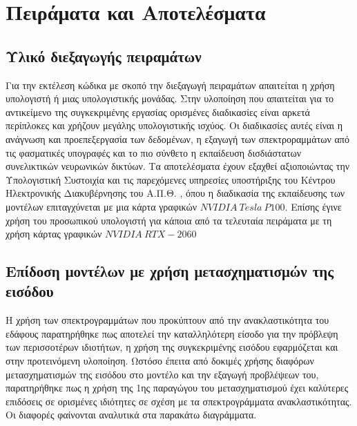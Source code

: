 \chapter{Πειράματα και Αποτελέσματα}
\label{ch:experiments_and_results}

\section{Υλικό διεξαγωγής πειραμάτων}
Για την εκτέλεση κώδικα με σκοπό την διεξαγωγή πειραμάτων απαιτείται η χρήση υπολογιστή ή μιας υπολογιστικής μονάδας. Στην υλοποίηση που απαιτείται για το αντικείμενο της συγκεκριμένης εργασίας ορισμένες διαδικασίες είναι αρκετά περίπλοκες και χρήζουν μεγάλης υπολογιστικής ισχύος. Οι διαδικασίες αυτές είναι η ανάγνωση και προεπεξεργασία των δεδομένων, η εξαγωγή των σπεκτροραμμάτων από τις φασματικές υπογραφές και το πιο σύνθετο η εκπαίδευση δισδιάστατων συνελικτικών νευρωνικών δικτύων.
Τα αποτελέσματα έχουν εξαχθεί αξιοποιώντας την Υπολογιστική Συστοιχία και τις παρεχόμενες υπηρεσίες υποστήριξης του Κέντρου Ηλεκτρονικής Διακυβέρνησης του Α.Π.Θ. \cite{hpcauth}, όπου η διαδικασία της εκπαίδευσης των μοντέλων επιταγχύνεται με μια κάρτα γραφικών $NVIDIA~Tesla~P100$. Επίσης έγινε χρήση του προσωπικού υπολογιστή για κάποια από τα τελευταία πειράματα με τη χρήση κάρτας γραφικών $NVIDIA~RTX-2060$

\section{Επίδοση μοντέλων με χρήση μετασχηματισμών της εισόδου }
Η χρήση των σπεκτρογραμμάτων που προκύπτουν από την ανακλαστικότητα  του εδάφους παρατηρήθηκε πως αποτελεί την καταλληλότερη είσοδο για την πρόβλεψη των περισσοτέρων ιδιοτήτων, η χρήση της συγκεκριμένης εισόδου  εφαρμόζεται και στην προτεινόμενη υλοποίηση. Ωστόσο έπειτα από δοκιμές χρήσης διαφόρων μετασχηματισμών της εισόδου στο μοντέλο και την εξαγωγή προβλέψεων του, παρατηρήθηκε πως η χρήση της 1ης παραγώγου του μετασχηματισμού  έχει καλύτερες επιδόσεις σε ορισμένες ιδιότητες σε σχέση με τα σπεκτρογράμματα ανακλαστικότητας. Οι διαφορές φαίνονται αναλυτικά στα παρακάτω διαγράμματα.

